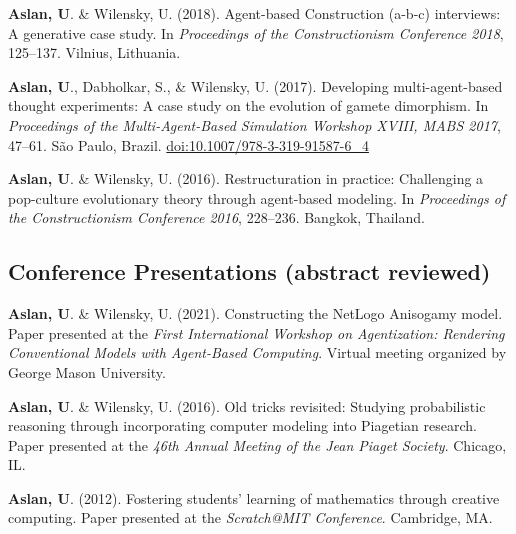 \documentclass[11pt,letterpaper]{report} %
\begin{document}
\begin{tablist}
        \item[2018] \tab{}\textbf{Aslan, U}. \& Wilensky, U. (2018). Agent-based Construction (a-b-c) interviews: A generative case study. In \textit{Proceedings of the Constructionism Conference 2018}, 125--137. Vilnius, Lithuania.

        \item[2017] \tab{}\textbf{Aslan, U}., Dabholkar, S., \& Wilensky, U. (2017). Developing multi-agent-based thought experiments: A case study on the evolution of gamete dimorphism. In \textit{Proceedings of the Multi-Agent-Based Simulation Workshop XVIII, MABS 2017}, 47--61. São Paulo, Brazil. \href{https://doi.org/10.1007/978-3-319-91587-6\_4}{doi:10.1007/978-3-319-91587-6\_4}

        \item[2016] \tab{}\textbf{Aslan, U}. \& Wilensky, U. (2016). Restructuration in practice: Challenging a pop-culture evolutionary theory through agent-based modeling. In \textit{Proceedings of the Constructionism Conference 2016}, 228--236. Bangkok, Thailand.


    \end{tablist}

    \subsection*{Conference Presentations (abstract reviewed)}

    \begin{tablist}

        \item[2021] \tab{}\textbf{Aslan, U}. \& Wilensky, U. (2021). Constructing the NetLogo Anisogamy model. Paper presented at the \textit{First International Workshop on Agentization: Rendering Conventional Models with Agent-Based Computing}. Virtual meeting organized by George Mason University.

        \item[2016] \tab{}\textbf{Aslan, U}. \& Wilensky, U. (2016). Old tricks revisited: Studying probabilistic reasoning through incorporating computer modeling into Piagetian research. Paper presented at the \textit{46th Annual Meeting of the Jean Piaget Society}. Chicago, IL.

        \item[2012] \tab{}\textbf{Aslan, U}. (2012). Fostering students' learning of mathematics through creative computing. Paper presented at the \textit{Scratch@MIT Conference}. Cambridge, MA.

    \end{tablist}
\end{document}
